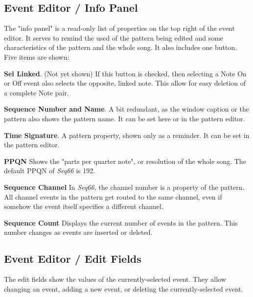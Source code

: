 \subsection{Event Editor / Info Panel}
\label{subsec:event_editor_info}

   The "info panel" is a read-only list of properties on the top right
   of the event editor.  It serves to remind the used of the pattern being
   edited and some characteristics of the pattern and the whole song.
   It also includes one button.
   Five items are shown:

   \begin{enumber}
      \item \textbf{Sel Linked}. (Not yet shown)
         If this button is checked, then selecting a Note On or Off event
         also selects the opposite, linked note.
         This allow for easy deletion of a complete Note pair.
      \item \textbf{Sequence Number and Name}.
         A bit redundant, as the window caption or the pattern
         also shows the pattern name.
         It can be set here or in the pattern editor.
      \item \textbf{Time Signature}.
         A pattern property, shown only as a reminder.
         It can be set in the pattern editor.
      \item \textbf{PPQN}
         Shows the "parts per quarter note", or resolution of the
         whole song.  The default PPQN of \textsl{Seq66} is 192.
      \item \textbf{Sequence Channel}
         In \textsl{Seq66}, the channel number is a property of the
         pattern.  All channel events in the pattern get routed to the same
         channel, even if somehow the event itself specifies a different
         channel.
      \item \textbf{Sequence Count}
         Displays the current number of events in the pattern.
         This number changes as events are inserted or deleted.
   \end{enumber}

\subsection{Event Editor / Edit Fields}
\label{subsec:event_editor_fields}

   The edit fields show the values of the currently-selected event.  They allow
   changing an event, adding a new event, or deleting the currently-selected
   event.

